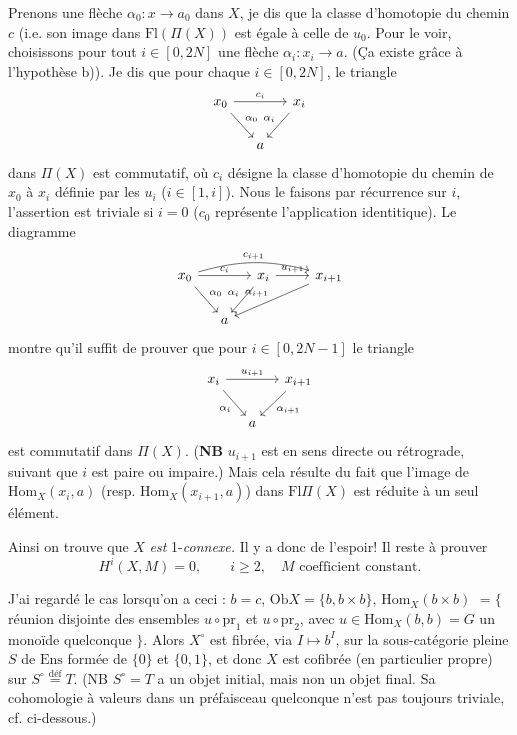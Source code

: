 \documentclass[11pt]{article}
\newcommand{\printedpage}[1]{\marginpar{\footnotesize p.~#1}}
\newcommand{\msp}[1]{\marginpar{\footnotesize [#1]}}
\newcommand{\Hom}{\mathrm{Hom}}
\newcommand{\Fl}{\mathrm{Fl}}
\newcommand{\Ob}{\mathrm{Ob}}
\newcommand{\Ens}{\mathrm{Ens}}
\newcommand{\pr}{\mathrm{pr}}
\newcommand{\deq}{\mathrel{\overset{\text{déf}}{=}}}
\begin{document}
Prenons une flèche $\alpha_0 : x\longrightarrow a_0$ dans $X$, je dis que la %
\msp{page 2}
classe d'homotopie du chemin $c$ (i.e. son image dans $\Fl(\Pi(X))$ est égale à celle de $u_0$. %
Pour le voir, choisissons pour tout $i\in[0,2N]$ une flèche $\alpha_i : x_i\longrightarrow a$. (Ça existe grâce à l'hypothèse b)). Je dis que pour chaque $i\in[0,2N]$, le triangle
\printedpage{2}
\[
\begin{tikzcd}[column sep=small]
x_0 \arrow[rr, "c_i"] \arrow[dr, "\alpha_0"] & & x_i \arrow[dl, "\alpha_i"'] \\
& a &
\end{tikzcd}
\]
dans $\Pi(X)$ est commutatif, où $c_i$ désigne la classe d'homotopie du chemin de $x_0$ à $x_i$ définie par les $u_i$ ($i\in[1,i]$). Nous le faisons par récurrence sur $i$, l'assertion est triviale si $i = 0$ ($c_0$ représente l'application identitique). Le diagramme %
\[
\begin{tikzcd}[column sep=small]
x_0 \arrow[rr, "c_i"] \arrow[dr, "\alpha_0"] \arrow[rrrr, bend left=15, "c_{i+1}"] & & x_i \arrow[dl, "\alpha_i"'] \arrow[rr, "u_{i+1}"] & & x_{i+1} \arrow[dlll, "\alpha_{i+1}"'] \\ %
& a & & &
\end{tikzcd}
\]
montre qu'il suffit de prouver que pour $i\in[0,2N-1]$ le triangle
\[
\begin{tikzcd}[column sep=small]
x_i \arrow[rr, "u_{i+1}"] \arrow[dr, "\alpha_i"'] & & x_{i+1} \arrow[dl, "\alpha_{i+1}"] \\
& a &
\end{tikzcd}
\]
est commutatif dans $\Pi(X)$. (\textbf{NB} $u_{i+1}$ est en sens directe ou rétrograde, suivant que %
$i$ est paire ou impaire.) Mais cela résulte du fait que l'image de $\Hom_X(x_i,a)$ (resp. $\Hom_X(x_{i+1},a)$) %
\msp{page 3}
dans $\Fl\Pi(X)$ est réduite à un seul élément.

Ainsi on trouve que $X$ \textit{est} 1-\textit{connexe.} Il y a donc de l'espoir! Il reste à prouver
\[
H^i(X,M) = 0, \qquad i\geq 2, \quad M \text{ coefficient constant.}
\]

J'ai regardé le cas lorsqu'on a ceci : $b = c$, $\Ob X = \{b, b\times b\}$, $\Hom_X(b\times b)$ $= \{$ réunion disjointe des ensembles $u\circ\pr_1$ et $u\circ\pr_2$, avec $u\in\Hom_X(b,b) = G$ un monoïde quelconque $\}$. Alors $X^\circ$ est fibrée, via $I\longmapsto b^I$, sur la sous-catégorie pleine $S$ de $\Ens$ formée de $\{0\}$ et $\{0,1\}$, et donc $X$ est cofibrée (en particulier propre) sur $S^\circ \deq T$. (NB $S^\circ = T$ a un objet initial, mais non un objet final. Sa cohomologie à valeurs dans un préfaisceau quelconque n'est pas toujours triviale, cf. ci-dessous.)
\end{document}

